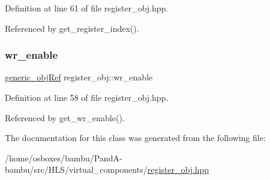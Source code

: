 Definition at line 61 of file register\+\_\+obj.\+hpp.



Referenced by get\+\_\+register\+\_\+index().

\mbox{\label{classregister__obj_aa6abe3f4f66eb7f68519bfb511b162d5}} 
\subsubsection{\texorpdfstring{wr\+\_\+enable}{wr\_enable}}
{\footnotesize\ttfamily \hyperlink{generic__obj_8hpp_acb533b2ef8e0fe72e09a04d20904ca81}{generic\+\_\+obj\+Ref} register\+\_\+obj\+::wr\+\_\+enable\hspace{0.3cm}{\ttfamily [private]}}



Definition at line 58 of file register\+\_\+obj.\+hpp.



Referenced by get\+\_\+wr\+\_\+enable().



The documentation for this class was generated from the following file\+:\begin{DoxyCompactItemize}
\item 
/home/osboxes/bambu/\+Pand\+A-\/bambu/src/\+H\+L\+S/virtual\+\_\+components/\hyperlink{register__obj_8hpp}{register\+\_\+obj.\+hpp}\end{DoxyCompactItemize}
